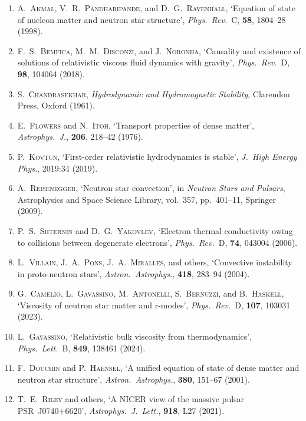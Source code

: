 \begin{enumerate}
\item A.~\textsc{Akmal}, V.~R.~\textsc{Pandharipande}, and
  D.~G.~\textsc{Ravenhall}, `Equation of state of nucleon matter and
  neutron star structure', \emph{Phys.\ Rev.}~C, \textbf{58}, 1804--28
  (1998).

\item F.~S.~\textsc{Bemfica}, M.~M.~\textsc{Disconzi}, and
  J.~\textsc{Noronha}, `Causality and existence of solutions of
  relativistic viscous fluid dynamics with gravity',
  \emph{Phys.\ Rev.}~D, \textbf{98}, 104064 (2018).

\item S.~\textsc{Chandrasekhar}, \emph{Hydrodynamic and
  Hydromagnetic Stability}, Clarendon Press, Oxford (1961).

\item E.~\textsc{Flowers} and N.~\textsc{Itoh}, `Transport properties
  of dense matter', \emph{Astrophys.\ J.}, \textbf{206}, 218--42
  (1976).

\item P.~\textsc{Kovtun}, `First-order relativistic hydrodynamics is
  stable', \emph{J.\ High Energy Phys.}, 2019:34 (2019).

\item A.~\textsc{Reisenegger}, `Neutron star convection', in
  \emph{Neutron Stars and Pulsars}, Astrophysics and Space Science
  Library, vol.~357, pp.~401--11, Springer (2009).

\item P.~S.~\textsc{Shternin} and D.~G.~\textsc{Yakovlev}, `Electron
  thermal conductivity owing to collisions between degenerate
  electrons', \emph{Phys.\ Rev.}~D, \textbf{74}, 043004 (2006).

\item L.~\textsc{Villain}, J.~A.~\textsc{Pons},
  J.~A.~\textsc{Miralles}, and others, `Convective instability in
  proto-neutron stars', \emph{Astron.\ Astrophys.}, \textbf{418},
  283--94 (2004).

\item G.~\textsc{Camelio}, L.~\textsc{Gavassino}, M.~\textsc{Antonelli},
  S.~\textsc{Bernuzzi}, and B.~\textsc{Haskell}, `Viscosity of neutron
  star matter and r-modes', \emph{Phys.\ Rev.}~D, \textbf{107}, 103031
  (2023).

\item L.~\textsc{Gavassino}, `Relativistic bulk viscosity from
  thermodynamics', \emph{Phys.\ Lett.}~B, \textbf{849}, 138461
  (2024).

\item F.~\textsc{Douchin} and P.~\textsc{Haensel}, `A unified equation
  of state of dense matter and neutron star structure',
  \emph{Astron.\ Astrophys.}, \textbf{380}, 151--67 (2001).

\item T.~E.~\textsc{Riley} and others, `A NICER view of the massive
  pulsar PSR~J0740+6620', \emph{Astrophys.\ J.\ Lett.}, \textbf{918},
  L27 (2021).
\end{enumerate}
